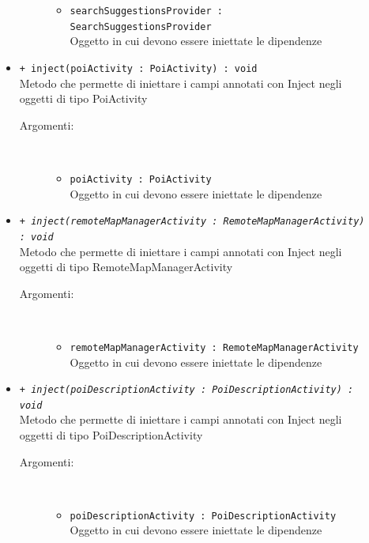 \documentclass[../DefinizioneDiProdotto.tex]{subfiles}
\begin{document}
\begin{description}
\begin{itemize}
\begin{description}
\begin{itemize}
				\item \texttt{searchSuggestionsProvider : SearchSuggestionsProvider}\\
				Oggetto in cui devono essere iniettate le dipendenze\end{itemize}
		\end{description}
		\item \texttt{+ inject(poiActivity : PoiActivity) : void}\\
		Metodo che permette di iniettare i campi annotati con Inject negli oggetti di tipo PoiActivity
		\begin{description}
			\item[Argomenti:] \
			\begin{itemize}
				\item \texttt{poiActivity : PoiActivity}\\
				Oggetto in cui devono essere iniettate le dipendenze\end{itemize}
		\end{description}
		\item \texttt{+ \textit{inject(remoteMapManagerActivity : RemoteMapManagerActivity) : void}}\\
		Metodo che permette di iniettare i campi annotati con Inject negli oggetti di tipo RemoteMapManagerActivity
		\begin{description}
			\item[Argomenti:] \
			\begin{itemize}
				\item \texttt{remoteMapManagerActivity : RemoteMapManagerActivity}\\
				Oggetto in cui devono essere iniettate le dipendenze\end{itemize}
		\end{description}
		\item \texttt{+ \textit{inject(poiDescriptionActivity : PoiDescriptionActivity) : void}}\\
		Metodo che permette di iniettare i campi annotati con Inject negli oggetti di tipo PoiDescriptionActivity
		\begin{description}
			\item[Argomenti:] \
			\begin{itemize}
				\item \texttt{poiDescriptionActivity : PoiDescriptionActivity}\\
				Oggetto in cui devono essere iniettate le dipendenze\end{itemize}
		\end{description}

\end{itemize}
\end{description}
\end{document}
